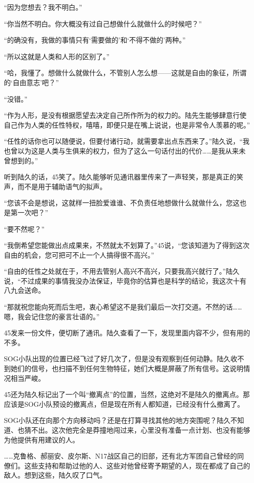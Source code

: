 “因为您想去？我不明白。”

“你当然不明白。你大概没有过自己想做什么就做什么的时候吧？”

“的确没有，我做的事情只有‘需要做的’和‘不得不做的’两种。”

“所以这就是人类和人形的区别了。”

“哈，我懂了。想做什么就做什么，不管别人怎么想——这就是自由的象征，所谓的‘自由意志’吧？”

“没错。”

“作为人形，是没有根据愿望去决定自己所作所为的权力的。陆先生能够肆意行使自己作为人类的任性特权，嘻嘻，即便只是在嘴上说说，也是非常令人羡慕的呢。”

“任性的话你也可以随便说，但要付诸行动，就需要拿出点东西来了。”陆久说，“我也曾以为这是人类与生俱来的权力，但为了这么一句话付出的代价……是我从来未曾想到的。”

听到陆久的话，45笑了。陆久能够听见通讯器里传来了一声轻笑，那是真正的笑声，而不是用于辅助语气的拟声。

“您该不会是想说，这就样一扭脸爱谁谁、不负责任地想做什么就做什么，您这也是第一次吧？”

“要不然呢？”

“我倒希望您能做出点成果来，不然就太不划算了。”45说，“您该知道为了得到这次自由的机会，您可把可不止一个人搞得很不高兴。”

“自由的任性之处就在于，不用去管别人高兴不高兴，只要我高兴就行了。”陆久说，“不过成果的事情我没办法保证，毕竟你的估算也是科学的结论，我这次十有八九会送命。

“那就祝您能向死而后生吧，衷心希望这不是我们最后一次打交道。不然的话……嗯，我会记住您的豪言壮语的。”

45发来一份文件，便切断了通讯。陆久查看了一下，发现里面内容不少，但有用的不多。

SOG小队出现的位置已经飞过了好几次了，但是没有观察到任何动静。陆久收不到她们的信号，也扫描不到任何生物特征，她们大概是屏蔽了所有信号。这说明情况相当严峻。

45还为陆久标记出了一个叫“撤离点”的位置，当然，这绝对不是陆久的撤离点。那应该是SOG小队预设的撤离点，但是现在所有人都知道，已经没有什么撤离了。

SOG小队还在向那个方向移动吗？还是在打算寻找其他的地方突围呢？陆久不知道、也猜不出。这次他完全是莽撞地闯过来，心里没有准备一点计划、也没有能够为他提供有用建议的人。

……克鲁格、郝丽安、皮尔斯、N17战区自己的旧部，还有北方军团自己曾经的同僚们。这些支持和帮助过他的人、这些对他曾经寄予期望的人，现在都成了自己的敌人。想到这些，陆久叹了口气。


